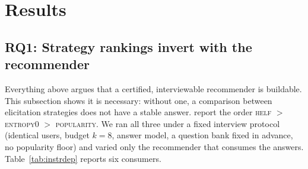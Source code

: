 \documentclass[acmsmall,review,anonymous]{acmart}
\begin{document}
\section{Results}\label{sec:results}

\subsection{RQ1: Strategy rankings invert with the recommender}\label{sec:res:inversion}

Everything above argues that a certified, interviewable recommender is buildable. This subsection shows it is necessary: without one, a comparison between elicitation strategies does not have a stable answer. \citet{rashid2002getting} report the order \textsc{helf} $>$ \textsc{entropy0} $>$ \textsc{popularity}. We ran all three under a fixed interview protocol (identical users, budget $k{=}8$, answer model, a question bank fixed in advance, no popularity floor) and varied only the recommender that consumes the answers. Table~\ref{tab:instrdep} reports six consumers.
\end{document}

